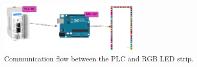         \begin{figure}[H]
            \centering
            \includegraphics[width = 0.6\textwidth]{2_images/rgbStrip}
            \caption{Communication flow between the PLC and RGB LED strip.}
            \label{fig:rgbStrip}
        \end{figure}          
        
        

        
        
    